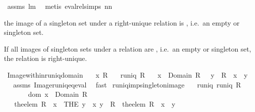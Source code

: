 \begin{isabellebody}
%
\isadelimproof
%
\endisadelimproof
%
\isatagproof
{}\isamarkupfalse%
\ assms\ lm{}{}{}\ \isamarkupfalse%
\ {\isacharparenleft}metis\ eval{\isacharunderscore}rel{\isachardot}simps\ nn{}{}{\isacharparenright}%
\endisatagproof
{\isafoldproof}%
%
\isadelimproof
%
\endisadelimproof
%
\begin{isamarkuptext}%
the image of a singleton set under a right-unique relation is
   , i.e.\ an empty or singleton set.%
\end{isamarkuptext}%
\isamarkuptrue%
%
\begin{isamarkuptext}%
If all images of singleton sets under a relation are
   , i.e.\ an empty or singleton set, the relation is right-unique.%
\end{isamarkuptext}%
\isamarkuptrue%
\isamarkupfalse%
\ Image{\isacharunderscore}within{\isacharunderscore}runiq{\isacharunderscore}domain{\isacharcolon}\isanewline
\ \ \ x\ R\isanewline
\ \ \ {\isachardoublequoteopen}runiq\ R{\isachardoublequoteclose}\isanewline
\ \ \ {\isachardoublequoteopen}x\ {\isasymin}\ Domain\ R\ {\isasymlongleftrightarrow}\ {\isacharparenleft}{\isasymexists}\ y\ {\isachardot}\ R\ {\isacharbackquote}{\isacharbackquote}\ {\isacharbraceleft}x{\isacharbraceright}\ {\isacharequal}\ {\isacharbraceleft}y{\isacharbraceright}{\isacharparenright}{\isachardoublequoteclose}%
\isadelimproof
\ %
\endisadelimproof
%
\isatagproof
{}\isamarkupfalse%
\ assms\ Image{\isacharunderscore}runiq{\isacharunderscore}eq{\isacharunderscore}eval\ \isamarkupfalse%
\ fast%
\endisatagproof
{\isafoldproof}%
%
\isadelimproof
%
\endisadelimproof
\isanewline
\isanewline
{}\isamarkupfalse%
\ runiq{\isacharunderscore}imp{\isacharunderscore}singleton{\isacharunderscore}image{\isacharprime}{\isacharcolon}\isanewline
\ \ \ runiq{\isacharcolon}\ {\isachardoublequoteopen}runiq\ R{\isachardoublequoteclose}\isanewline
\ \ \ \ \ \ \ dom{\isacharcolon}\ {\isachardoublequoteopen}x\ {\isasymin}\ Domain\ R{\isachardoublequoteclose}\isanewline
\ \ \ {\isachardoublequoteopen}the{\isacharunderscore}elem\ {\isacharparenleft}R\ {\isacharbackquote}{\isacharbackquote}\ {\isacharbraceleft}x{\isacharbraceright}{\isacharparenright}\ {\isacharequal}\ {\isacharparenleft}THE\ y\ {\isachardot}\ {\isacharparenleft}x{\isacharcomma}\ y{\isacharparenright}\ {\isasymin}\ R{\isacharparenright}{\isachardoublequoteclose}\ {\isacharparenleft}\ {\isachardoublequoteopen}the{\isacharunderscore}elem\ {\isacharparenleft}R\ {\isacharbackquote}{\isacharbackquote}\ {\isacharbraceleft}x{\isacharbraceright}{\isacharparenright}\ {\isacharequal}\ {\isacharquery}y{\isachardoublequoteclose}{\isacharparenright}\isanewline

\end{isabellebody}
